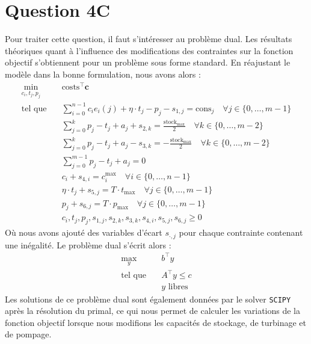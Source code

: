 \documentclass{article}
\begin{document}
\section*{Question 4C}
Pour traiter cette question, il faut s'intéresser au problème dual. Les résultats théoriques quant à l'influence des modifications des contraintes sur la fonction objectif s'obtiennent pour un problème sous forme standard.
En réajustant le modèle dans la bonne formulation, nous avons alors :
\begin{align}
    \min_{c_{i},t_j,p_j} \quad &\mathrm{costs}^\intercal\mathbf{c} \nonumber\\
    \textrm{tel que} \quad & \sum_{i=0}^{n-1} c_i e_i(j) + \eta \cdot t_j - p_j - s_{1,j} = \mathrm{cons}_j \quad \forall j \in  \{ 0, \ldots, m-1 \} \label{eq:4C_contr1}\\
    &\sum_{j=0}^{k} p_j - t_j + a_j + s_{2,k} =  \frac{\mathrm{stock}_\mathrm{max}}{2} \quad \forall k \in \{ 0, \ldots, m-2 \} \label{eq:4C_contr2}\\
    &\sum_{j=0}^{k} p_j - t_j + a_j - s_{3,k} =  -\frac{\mathrm{stock}_\mathrm{max}}{2} \quad \forall k \in \{ 0, \ldots, m-2 \} \label{eq:4C_contr3}\\
    & \sum_{j=0}^{m-1} p_j - t_j + a_j = 0\\
    &c_i + s_{4,i} = c_i^\mathrm{max} \quad \forall i \in  \{ 0, \ldots, n-1 \}\\
    &\eta \cdot t_j + s_{5,j} = T \cdot t_\mathrm{max} \quad \forall j \in  \{ 0, \ldots, m-1 \} \label{eq:4C_contr6}\\
    &p_j + s_{6,j} = T \cdot p_\mathrm{max} \quad \forall j \in  \{ 0, \ldots, m-1 \} \label{eq:4C_contr7}\\
    & c_i, t_j, p_j, s_{1,j}, s_{2,k}, s_{3,k}, s_{4,i}, s_{5,j}, s_{6,j} \geq 0
\end{align}
Où nous avons ajouté des variables d'écart $s_{\cdot,j}$ pour chaque contrainte contenant une inégalité.
Le problème dual s'écrit alors :
\begin{align*}
    \max_{y} \quad &b^\intercal y \quad\\ 
    \textrm{tel que} \quad &A^\intercal y \leq c\\
    & y \text{ libres}
\end{align*}
Les solutions de ce problème dual sont également données par le solver \verb|SCIPY| après la résolution du primal, ce qui nous permet de calculer les variations de la fonction objectif
lorsque nous modifions les capacités de stockage, de turbinage et de pompage.
\end{document}
